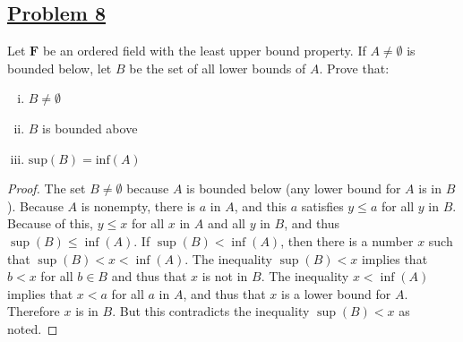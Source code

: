 \documentclass[10pt,letterpaper]{article}
\begin{document}
	\subsection*{{\color{purple}\underline{Problem 8}}}
	Let $\mathbf{F}$ be an ordered field with the least upper bound property. If $A \neq \emptyset$ is bounded below,
	let $B$ be the set of all lower bounds of $A$. Prove that:
	\begin{enumerate}[(i)]
		\item $B \neq \emptyset$
		\item $B$ is bounded above 
		\item $\mathrm{sup}(B) = \mathrm{inf}(A)$
	\end{enumerate}
	\begin{proof}
	The set $B \neq \emptyset$ because $A$ is bounded below (any lower bound for $A$ is in $B$).
	Because $A$ is nonempty, there is $a$ in $A$, and this $a$ satisfies $y \leq a$ for all $y$ in $B$.
	Because of this, $y \leq x$ for all $x$ in $A$ and all $y$ in $B$, and thus $\sup(B) \leq \inf(A)$.
	If $\sup(B) < \inf(A)$, then there is a number $x$ such that $\sup(B) < x < \inf(A)$. The inequality
	$\sup(B) < x$ implies that $b < x$ for all $b \in B$ and thus that $x$ is not in $B$. The inequality
	$x < \inf(A)$ implies that $x < a$ for all $a$ in $A$, and thus that $x$ is a lower bound for $A$.
	Therefore $x$ is in $B$. But this contradicts the inequality $\sup(B) < x$ as noted.
	\end{proof}
	
	
\end{document}
